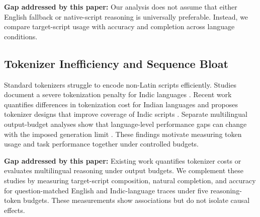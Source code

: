 \documentclass[11pt]{article}
\begin{document}
\noindent\textbf{Gap addressed by this paper:}
Our analysis does not assume that either English fallback or native-script reasoning is universally preferable. Instead, we compare target-script usage with accuracy and completion across language conditions.

\subsection{Tokenizer Inefficiency and Sequence Bloat}
\label{sec:related_cat3}

Standard tokenizers struggle to encode non-Latin scripts efficiently. Studies document a severe tokenization penalty for Indic languages \citep{srivastava2026tokenizertax, shravan2026brahmic}. Recent work quantifies differences in tokenization cost for Indian languages and proposes tokenizer designs that improve coverage of Indic scripts \citep{srivastava2026tokenizertax, shravan2026brahmic}. Separate multilingual output-budget analyses show that language-level performance gaps can change with the imposed generation limit \citep{goyal2026mindthecap}. These findings motivate measuring token usage and task performance together under controlled budgets.

\noindent\textbf{Gap addressed by this paper:}
Existing work quantifies tokenizer costs or evaluates multilingual reasoning under output budgets. We complement these studies by measuring target-script composition, natural completion, and accuracy for question-matched English and Indic-language traces under five reasoning-token budgets. These measurements show associations but do not isolate causal effects.


\end{document}

